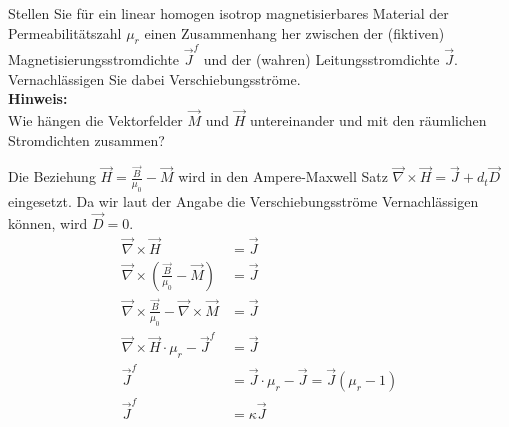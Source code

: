 \begin{question}[section=2,subsection=21,name={Wahre und fiktive Stromdichte},difficulty=2,type=exercise,tags={20161207}]
	Stellen Sie für ein linear homogen isotrop magnetisierbares Material der Permeabilitätszahl $\mu_r$ einen Zusammenhang her zwischen der (fiktiven) Magnetisierungsstromdichte $\vec J^f$ und der (wahren) Leitungsstromdichte $ \vec J$. Vernachlässigen Sie dabei Verschiebungsströme.
	\\ \textbf{Hinweis:}\\
	Wie hängen die Vektorfelder $\vec M$ und $\vec H$ untereinander und mit den räumlichen Stromdichten zusammen?
\end{question}
\begin{solution}
	Die Beziehung $\vec H = \frac{\vec B}{\mu_0} - \vec M$ wird in den Ampere-Maxwell Satz $\vec \nabla \times \vec H = \vec J + d_t \vec D$ eingesetzt. Da wir laut der Angabe die Verschiebungsströme Vernachlässigen können, wird $\vec D = 0$.
	\begin{align}
		\vec \nabla \times \vec H &= \vec J\\
		\vec \nabla \times ( \frac{\vec B}{\mu_0} - \vec M) &= \vec J\\
		\vec \nabla \times \frac{\vec B}{\mu_0} - \vec \nabla \times  \vec M &= \vec J\\
		\vec \nabla \times  \vec H \cdot \mu_r - \vec J^f &= \vec J\\
		\vec J^f &= \vec J \cdot \mu_r - \vec J = \vec J (\mu_r -1)\\
		\vec J^f &= \kappa \vec J
	\end{align}
\end{solution}